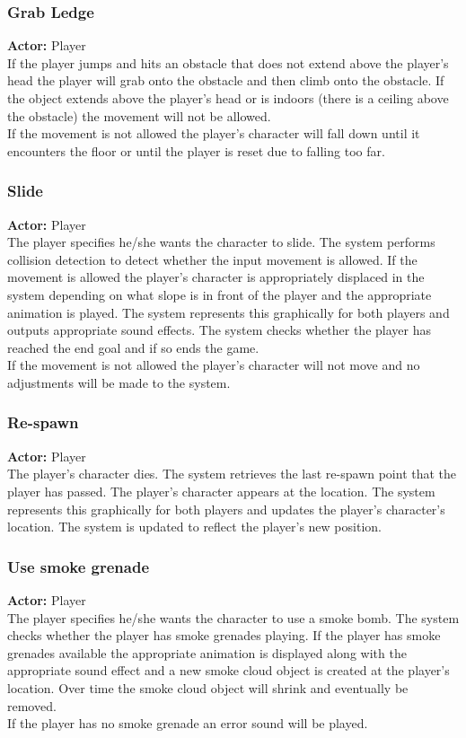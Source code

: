\documentclass[11pt,a4paper]{article}
\begin{document}
\subsubsection{Grab Ledge}
\textbf{Actor:} Player\smallskip\\
If the player jumps and hits an obstacle that does not extend above the player's head the player will grab onto the obstacle and then climb onto the obstacle. If the object extends above the player's head or is indoors (there is a ceiling above the obstacle) the movement will not be allowed.\smallskip\\
If the movement is not allowed the player's character will fall down until it encounters the floor or until the player is reset due to falling too far.

\subsubsection{Slide}
\textbf{Actor:} Player\smallskip\\
The player specifies he/she wants the character to slide. The system performs collision detection to detect whether the input movement is allowed. If the movement is allowed the player's character is appropriately displaced in the system depending on what slope is in front of the player and the appropriate animation is played. The system represents this graphically for both players and outputs appropriate sound effects. The system checks whether the player has reached the end goal and if so ends the game.\smallskip\\
If the movement is not allowed the player's character will not move and no adjustments will be made to the system.

\subsubsection{Re-spawn}
\textbf{Actor:} Player\smallskip\\
The player's character dies. The system retrieves the last re-spawn point that the player has passed. The player's character appears at the location. The system represents this graphically for both players and updates the player's character's location.  The system is updated to reflect the player's new position.\smallskip\\

\subsubsection{Use smoke grenade}
\textbf{Actor:} Player\smallskip\\
The player specifies he/she wants the character to use a smoke bomb. The system checks whether the player has smoke grenades playing. If the player has smoke grenades available the appropriate animation is displayed along with the appropriate sound effect and a new smoke cloud object is created at the player's location. Over time the smoke cloud object will shrink and eventually be removed.\smallskip\\
If the player has no smoke grenade an error sound will be played.
\end{document}
